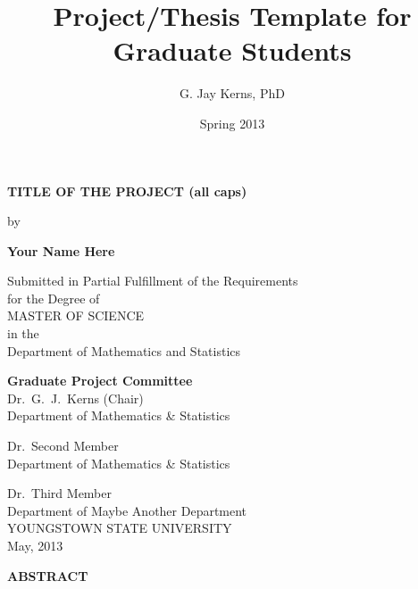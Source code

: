 \documentclass[11pt]{article}
\author{G. Jay Kerns, PhD}
\date{Spring 2013}
\title{Project/Thesis Template for Graduate Students}
\renewcommand{\maketitle}{}
\begin{document}
\maketitle

%

\newpage
\begin{center}
\textbf{TITLE OF THE PROJECT (all caps)} 

\vspace{0.25in}
by 
\vspace{0.25in}

\textbf{Your Name Here}

\vspace{1in}

Submitted in Partial Fulfillment of the Requirements\\
for the Degree of\\
\vspace{0.1in}
MASTER OF SCIENCE\\
\vspace{0.1in}
in the\\
Department of Mathematics and Statistics\\

\vspace{1in}

\textbf{Graduate Project Committee}\\
\bigskip
Dr.\ G.\ J.\ Kerns (Chair)\\
Department of Mathematics \& Statistics\\
\bigskip

Dr.\ Second Member\\
Department of Mathematics \& Statistics\\
\bigskip

Dr.\ Third Member \\
Department of Maybe Another Department\\

\vfill
YOUNGSTOWN STATE UNIVERSITY\\
May, 2013 
\end{center}

\newpage
\begin{center}
\textbf{ABSTRACT} 
\end{center} \vspace{0.25in}
\end{document}
